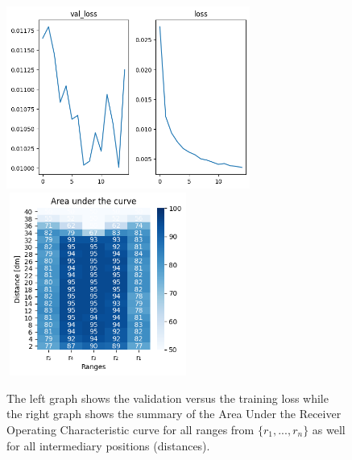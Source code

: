 \begin{multicols}{2}
\begin{itemize}
\end{itemize}
\end{multicols}\begin{figure}[H]%
\centering
\includegraphics[width=8cm,height=6cm]{3_models/models_44/graph_44.png}
\hspace{0.2 cm}
\includegraphics[width=6cm,height=6cm]{4_plots/plots_44/AUC_44.png}
\caption{The left graph shows the validation versus the training loss while the right graph shows the summary of the Area Under the Receiver Operating Characteristic curve for all ranges from $\{r_{1}, ... ,r_{n}\}$ as well for all intermediary positions (distances).}
\label{auc_44}
\end{figure}


\newpage
